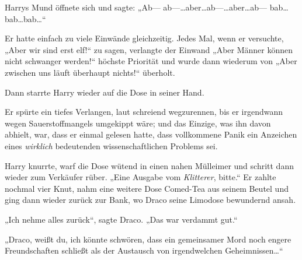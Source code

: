 Harrys Mund öffnete sich und sagte: „Ab— ab—…aber…ab—…aber…ab— bab…bab…bab…“

Er hatte einfach zu viele Einwände gleichzeitig. Jedes Mal, wenn er versuchte, „Aber wir sind erst elf!“ zu sagen, verlangte der Einwand „Aber Männer können nicht schwanger werden!“ höchste Priorität und wurde dann wiederum von „Aber zwischen uns läuft überhaupt nichts!“ überholt.

Dann starrte Harry wieder auf die Dose in seiner Hand.

Er spürte ein tiefes Verlangen, laut schreiend wegzurennen, bis er irgendwann wegen Sauerstoffmangels umgekippt wäre; und das Einzige, was ihn davon abhielt, war, dass er einmal gelesen hatte, dass vollkommene Panik ein Anzeichen eines \emph{wirklich} bedeutenden wissenschaftlichen Problems sei.

Harry knurrte, warf die Dose wütend in einen nahen Mülleimer und schritt dann wieder zum Verkäufer rüber. „Eine Ausgabe vom \emph{Klitterer}, bitte.“ Er zahlte nochmal vier Knut, nahm eine weitere Dose Comed-Tea aus seinem Beutel und ging dann wieder zurück zur Bank, wo Draco seine Limodose bewundernd ansah.

„Ich nehme alles zurück“, sagte Draco. „Das war verdammt gut.“

„Draco, weißt du, ich könnte schwören, dass ein gemeinsamer Mord noch engere Freundschaften schließt als der Austausch von irgendwelchen Geheimnissen…“

